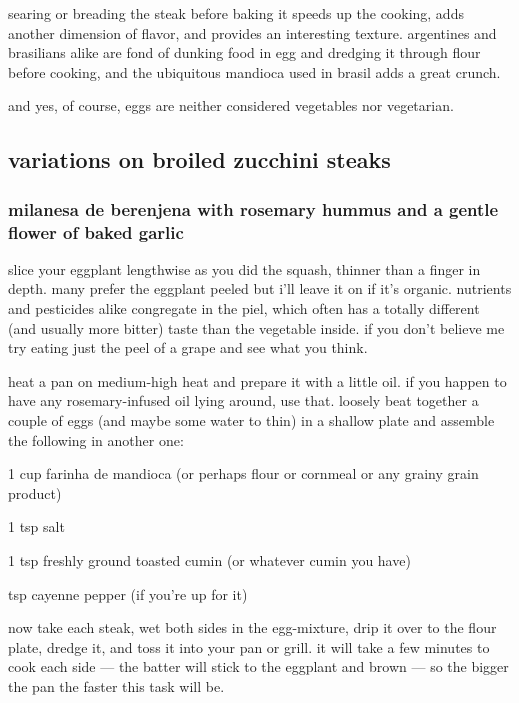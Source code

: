 searing or breading the steak before baking it speeds up the cooking,
adds another dimension of flavor, and provides an interesting
texture. argentines and brasilians alike are fond of dunking food in
egg and dredging it through flour before cooking, and the ubiquitous
mandioca used in brasil adds a great crunch.

and yes, of course, eggs are neither considered vegetables nor
vegetarian.

\subsection{variations on broiled zucchini steaks}

\subsubsection{milanesa de berenjena with rosemary hummus and a gentle flower of baked garlic}

slice your eggplant lengthwise as you did the squash, thinner than a
finger in depth. many prefer the eggplant peeled but i'll leave it on
if it's organic. nutrients and pesticides alike congregate in the
\gls{piel}, which often has a totally different
(and usually more bitter) taste than the vegetable inside. if you
don't believe me try eating just the peel of a grape and see what you
think.

heat a pan on medium-high heat and prepare it with a little oil. if
you happen to have any rosemary-infused oil lying around, use
that. loosely beat together a couple of eggs (and maybe some water to
thin) in a shallow plate and assemble the following in another one:

\begin{ingredients}
  \item 1 cup \gls{farinha de mandioca} (or perhaps flour or cornmeal or any grainy grain product)
  \item 1 tsp salt
  \item 1 tsp freshly ground toasted cumin (or whatever cumin you have)
  \item \onequarter tsp cayenne pepper (if you're up for it)
\end{ingredients}

now take each steak, wet both sides in the egg-mixture, drip it over
to the flour plate, dredge it, and toss it into your pan or grill. it
will take a few minutes to cook each side --- the batter will stick to
the eggplant and brown --- so the bigger the pan the faster this task
will be.

